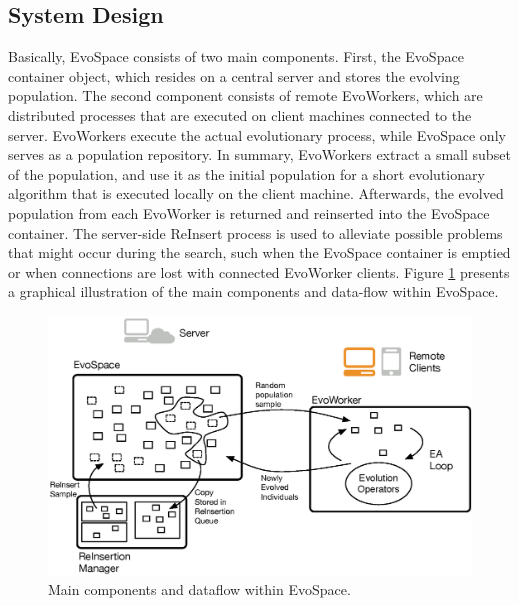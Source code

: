 \subsection{System Design}
Basically, EvoSpace consists of two main components. %
First, the EvoSpace container object, which resides on a central server and stores the evolving population.
The second component consists of remote EvoWorkers, which are distributed processes that are executed on client machines connected to the server.
EvoWorkers execute the actual evolutionary process, while EvoSpace only serves as a population repository.
In summary, EvoWorkers extract a small subset of the population, and use it as
the initial population for a short evolutionary algorithm that is executed
locally on the client machine. Afterwards, the evolved population from each EvoWorker is returned and reinserted into the EvoSpace container.
The server-side ReInsert process is used to alleviate possible problems that might occur during the search, such when the EvoSpace container
is emptied or when connections are lost with connected EvoWorker clients.
Figure \ref{fig:evo} presents a graphical illustration of the main components and data-flow within EvoSpace.

\begin{figure}[t]
    \centering
        \includegraphics[width=12cm]{evospaceExample.eps}
    \caption{Main components and dataflow within EvoSpace.}
    \label{fig:evo}
\end{figure}

